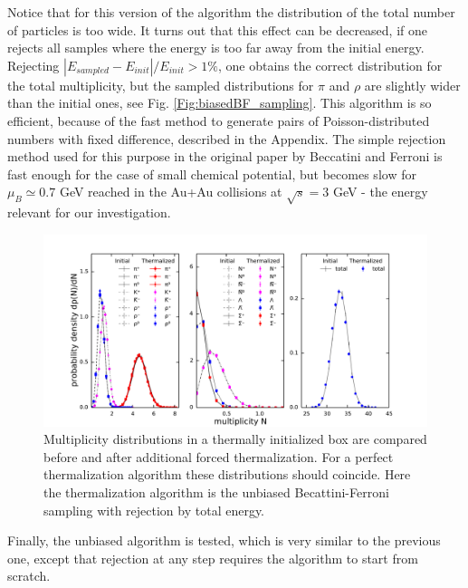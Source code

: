 Notice that for this version of the algorithm the distribution of the total
number of particles is too wide. It turns out that this effect can be
decreased, if one rejects all samples where the energy is too far away from the
initial energy. Rejecting $|E_{sampled} - E_{init}|/E_{init} > 1\%$, one obtains
the correct distribution for the total multiplicity, but the sampled
distributions for $\pi$ and $\rho$ are slightly wider than the initial ones,
see Fig. \ref{Fig:biasedBF_sampling}. This algorithm is so efficient, because
of the fast method to generate pairs of Poisson-distributed numbers with fixed
difference, described in the Appendix. The simple rejection method used for
this purpose in the original paper by Beccatini and Ferroni is fast enough for
the case of small chemical potential, but becomes slow for $\mu_B \simeq 0.7$
GeV reached in the Au+Au collisions at $\sqrt{s} = 3$ GeV - the energy relevant
for our investigation.

\begin{figure}
  \includegraphics[width=\textwidth]{plots/forced_thermalization/BF_unbiased.pdf}
  \caption{Multiplicity distributions in a thermally initialized box are
           compared before and after additional forced thermalization. For a perfect
           thermalization algorithm these distributions should coincide. Here the
           thermalization algorithm is the unbiased Becattini-Ferroni sampling with
           rejection by total energy.}
  \label{Fig:BFefix_sampling}
\end{figure}

Finally, the unbiased algorithm is tested, which is very similar to the previous one,
 except that rejection at any step requires the algorithm to start from scratch.

